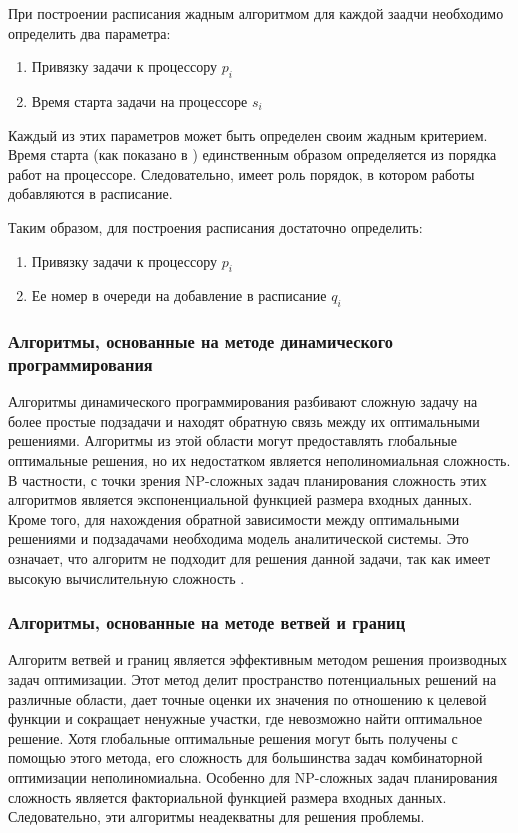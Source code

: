 При построении расписания жадным алгоритмом для каждой заадчи необходимо определить два параметра:
\begin{enumerate}
    \item Привязку задачи к процессору $p_i$
    \item Время старта задачи на процессоре $s_i$
\end{enumerate}
Каждый из этих параметров может быть определен своим жадным критерием. Время старта (как показано в \cite{Kalashnikov_2004}) единственным образом определяется из порядка работ на процессоре. Следовательно, имеет роль порядок, в котором работы добавляются в расписание.

Таким образом, для построения расписания достаточно определить:
\begin{enumerate}
    \item Привязку задачи к процессору $p_i$
    \item Ее номер в очереди на добавление в расписание $q_i$
\end{enumerate}

\subsubsection{Алгоритмы, основанные на методе динамического программирования}

Алгоритмы динамического программирования разбивают сложную задачу на более простые подзадачи и находят обратную связь между их оптимальными решениями. Алгоритмы из этой области могут предоставлять глобальные оптимальные решения, но их недостатком является неполиномиальная сложность. В частности, с точки зрения NP-сложных задач планирования сложность этих алгоритмов является экспоненциальной функцией размера входных данных. Кроме того, для нахождения обратной зависимости между оптимальными решениями и подзадачами необходима модель аналитической системы. Это означает, что алгоритм не подходит для решения данной задачи, так как имеет высокую вычислительную сложность \cite{Dynamic_prog}.

\subsubsection{Алгоритмы, основанные на методе ветвей и границ}

Алгоритм ветвей и границ является эффективным методом решения производных задач оптимизации. Этот метод делит пространство потенциальных решений на различные области, дает точные оценки их значения по отношению к целевой функции и сокращает ненужные участки, где невозможно найти оптимальное решение. Хотя глобальные оптимальные решения могут быть получены с помощью этого метода, его сложность для большинства задач комбинаторной оптимизации неполиномиальна. Особенно для NP-сложных задач планирования сложность является факториальной функцией размера входных данных. Следовательно, эти алгоритмы неадекватны для решения проблемы.


